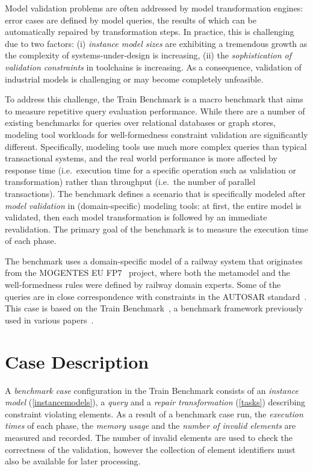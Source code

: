 \documentclass[submission,copyright,creativecommons]{eptcs}
\newcommand{\tb}{Train Benchmark\xspace}
\begin{document}
Model validation problems are often addressed by model transformation engines: error cases are defined by model queries, the results of which can be automatically repaired by transformation steps. In practice, this is challenging due to two factors: (i) \emph{instance model sizes} are exhibiting a tremendous growth as the complexity of systems-under-design is increasing, (ii) the \emph{sophistication of validation constraints} in toolchains is increasing. As a consequence, validation of industrial models is challenging or may become completely unfeasible.

To address this challenge, the \tb is a macro benchmark that aims to measure repetitive query evaluation performance. While there are a number of existing benchmarks for queries over relational databases or graph stores, modeling tool workloads for well-formedness constraint validation are significantly different. Specifically, modeling tools use much more complex queries than typical transactional systems, and the real world performance is more affected by response time (i.e.\ execution time for a specific operation such as validation or transformation) rather than throughput (i.e.\ the number of parallel transactions). The benchmark defines a scenario that is specifically modeled after \emph{model validation} in (domain-specific) modeling tools: at first, the entire model is validated, then each model transformation is followed by an immediate revalidation. The primary goal of the benchmark is to measure the execution time of each phase.

The benchmark uses a domain-specific model of a railway system that originates from the \mbox{MOGENTES} EU FP7~\cite{MOGENTES} project, where both the metamodel and the well-formedness rules were defined by railway domain experts. Some of the queries are in close correspondence with constraints in the AUTOSAR standard~\cite{AUTOSAR}. This case is based on the \tb~\cite{TrainBenchmarkTechReport}, a benchmark framework previously used in various papers~\cite{bigmde2013, ase2013, bigmde2014, models2014, scp2015}.

\section{Case Description}


A \emph{benchmark case} configuration in the \tb consists of an \emph{instance model} (\autoref{instancemodels}), a \emph{query} and a \emph{repair transformation} (\autoref{tasks}) describing constraint violating elements. As a result of a benchmark case run, the \emph{execution times} of each phase, the \emph{memory usage} and the \emph{number of invalid elements} are measured and recorded. The number of invalid elements are used to check the correctness of the validation, however the collection of element identifiers must also be available for later processing.
\end{document}
